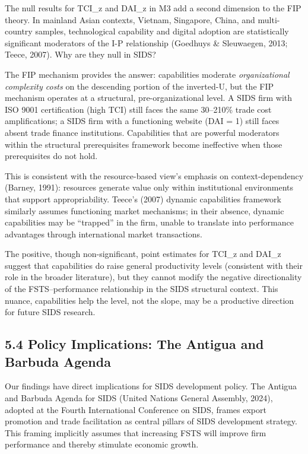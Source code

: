 \documentclass[
  12pt]{article}
\begin{document}
The null results for TCI\_z and DAI\_z in M3 add a second dimension to
the FIP theory. In mainland Asian contexts, Vietnam, Singapore, China,
and multi-country samples, technological capability and digital adoption
are statistically significant moderators of the I-P relationship
(Goedhuys \& Sleuwaegen, 2013; Teece, 2007). Why are they null in SIDS?

The FIP mechanism provides the answer: capabilities moderate
\emph{organizational complexity costs} on the descending portion of the
inverted-U, but the FIP mechanism operates at a structural,
pre-organizational level. A SIDS firm with ISO 9001 certification (high
TCI) still faces the same 30--210\% trade cost amplifications; a SIDS
firm with a functioning website (DAI = 1) still faces absent trade
finance institutions. Capabilities that are powerful moderators within
the structural prerequisites framework become ineffective when those
prerequisites do not hold.

This is consistent with the resource-based view's emphasis on
context-dependency (Barney, 1991): resources generate value only within
institutional environments that support appropriability. Teece's (2007)
dynamic capabilities framework similarly assumes functioning market
mechanisms; in their absence, dynamic capabilities may be ``trapped'' in
the firm, unable to translate into performance advantages through
international market transactions.

The positive, though non-significant, point estimates for TCI\_z and
DAI\_z suggest that capabilities do raise general productivity levels
(consistent with their role in the broader literature), but they cannot
modify the negative directionality of the FSTS--performance relationship
in the SIDS structural context. This nuance, capabilities help the
level, not the slope, may be a productive direction for future SIDS
research.

\hypertarget{policy-implications-the-antigua-and-barbuda-agenda}{%
\subsection{5.4 Policy Implications: The Antigua and Barbuda
Agenda}\label{policy-implications-the-antigua-and-barbuda-agenda}}

Our findings have direct implications for SIDS development policy. The
Antigua and Barbuda Agenda for SIDS (United Nations General Assembly,
2024), adopted at the Fourth International Conference on SIDS, frames
export promotion and trade facilitation as central pillars of SIDS
development strategy. This framing implicitly assumes that increasing
FSTS will improve firm performance and thereby stimulate economic
growth.
\end{document}
